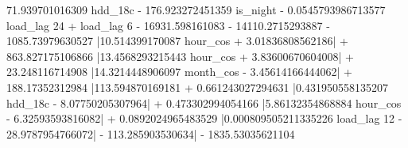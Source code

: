 71.939701016309 hdd_{18c} - 176.923272451359 is_{night} - 0.0545793986713577 load_{lag 24} + load_{lag 6} - 16931.598161083  - 14110.2715293887  - 1085.73979630527 \left|{10.514399170087 hour_{cos} + 3.01836808562186}\right| + 863.827175106866 \left|{13.4568293215443 hour_{cos} + 3.83600670604008}\right| + 23.248116714908 \left|{14.3214448906097 month_{cos} - 3.45614166444062}\right| + 188.17352312984 \left|{113.594870169181  + 0.661243027294631 \left|{0.431950558135207 hdd_{18c} - 8.07750205307964}\right| + 0.473302994054166 \left|{5.86132354868884 hour_{cos} - 6.32593593816082}\right| + 0.0892024965483529 \left|{0.000809505211335226 load_{lag 12} - 28.9787954766072}\right| - 113.285903530634}\right| - 1835.53035621104